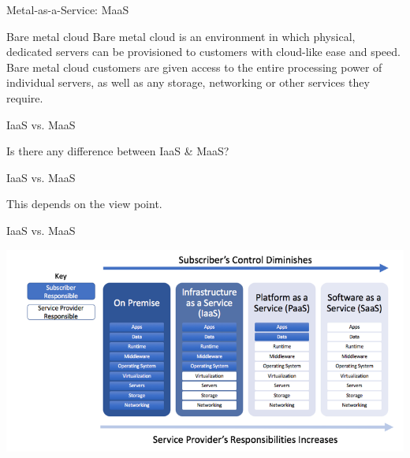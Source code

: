 \begin{frame}{Metal-as-a-Service: MaaS}
    \begin{block}{Bare metal cloud}
        Bare metal cloud is an environment in which physical, dedicated servers can be provisioned to customers with cloud-like ease and speed. Bare metal cloud customers are given access to the entire processing power of individual servers, as well as any storage, networking or other services they require.
    \end{block}
\end{frame}

\begin{frame}{IaaS vs. MaaS}

    \begin{center}
        Is there any difference between IaaS \& MaaS?
    \end{center}

\end{frame}

\begin{frame}{IaaS vs. MaaS}

    \begin{center}
        This depends on the view point.
    \end{center}

\end{frame}

\begin{frame}{IaaS vs. MaaS}

    \begin{center}
        \includegraphics{img/cloud-services-model.png}
    \end{center}

\end{frame}


